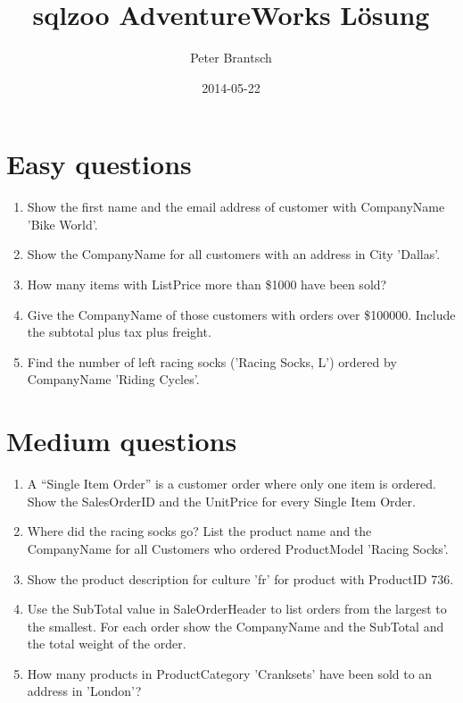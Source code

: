 \documentclass[a4paper]{article}
\begin{document}
	\title{sqlzoo AdventureWorks Lösung}
	\date{2014-05-22}
	\author{Peter Brantsch}
	\maketitle

	\section{Easy questions}
	\begin{enumerate}
		\item Show the first name and the email address of customer with
		CompanyName 'Bike World'.
			
		\item Show the CompanyName for all customers with an address in City
		'Dallas'.
			
		\item How many items with ListPrice more than \$1000 have been sold?
			
		\item Give the CompanyName of those customers with orders over
		\$100000. Include the subtotal plus tax plus freight.
			
		\item Find the number of left racing socks ('Racing Socks, L') ordered
		by CompanyName 'Riding Cycles'.
			
	\end{enumerate}

	\section{Medium questions}
	\begin{enumerate}
		\addtocounter{enumi}{5}
		\item A “Single Item Order” is a customer order where only one item is
		ordered. Show the SalesOrderID and the UnitPrice for every Single Item
		Order.
			
		\item Where did the racing socks go? List the product name and the
		CompanyName for all Customers who ordered ProductModel 'Racing Socks'.
			
		\item Show the product description for culture 'fr' for product with
		ProductID 736. 
			
		\item Use the SubTotal value in SaleOrderHeader to list orders from the
		largest to the smallest. For each order show the CompanyName and the
		SubTotal and the total weight of the order.
			
		\item How many products in ProductCategory 'Cranksets' have been sold
		to an address in 'London'?
			
	\end{enumerate}

\end{document}
